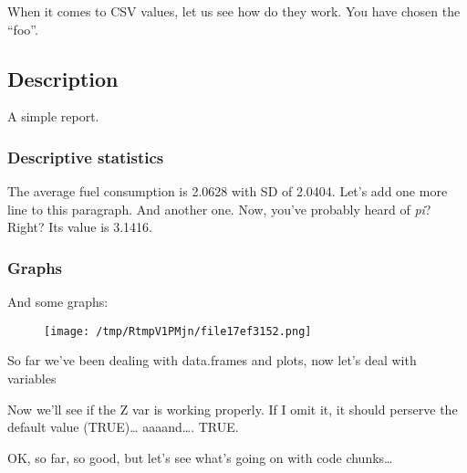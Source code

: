 \documentclass{article}
\makeatletter
\def\maxwidth{\ifdim\Gin@nat@width>\linewidth\linewidth
\else\Gin@nat@width\fi}
\let\Oldincludegraphics\includegraphics
\renewcommand{\includegraphics}[1]{\Oldincludegraphics[width=\maxwidth]{#1}}
\makeatother
\begin{document}
When it comes to CSV values, let us see how do they work. You have
chosen the ``foo''.

\subsection{Description}

A simple report.

\subsubsection{Descriptive statistics}

The average fuel consumption is 2.0628 with SD of 2.0404. Let's add one
more line to this paragraph. And another one. Now, you've probably heard
of \emph{pi}? Right? Its value is 3.1416.

\subsubsection{Graphs}

And some graphs:

\begin{figure}[htbp]
\centering
\texttt{[image: /tmp/RtmpV1PMjn/file17ef3152.png]}
\caption{}
\end{figure}

So far we've been dealing with data.frames and plots, now let's deal
with variables

Now we'll see if the Z var is working properly. If I omit it, it should
perserve the default value (TRUE)\ldots{} aaaand\ldots{}. TRUE.

OK, so far, so good, but let's see what's going on with code
chunks\ldots{}
\end{document}
